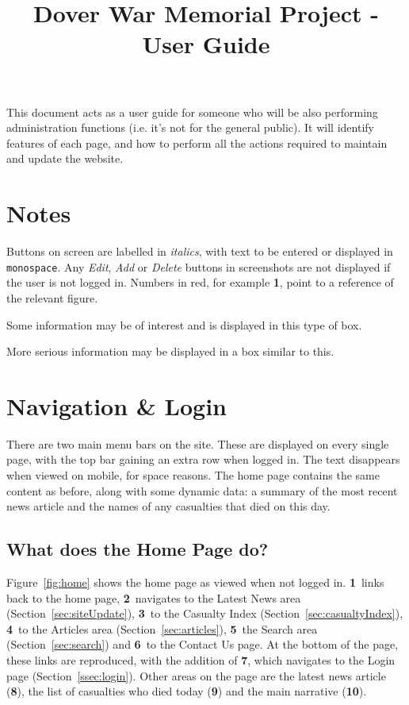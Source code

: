 \documentclass[12pt]{article}
\title{\vspace{-1cm}\textbf{Dover War Memorial Project - User Guide}\vspace{-1cm}}
\date{}
\author{}
\newcommand{\marker}[1]{\color{red}\textbf{#1}\color{black}}
\begin{document}
\maketitle

This document acts as a user guide for someone who will be also performing administration functions (i.e. it's not for the general public). It will identify features of each page, and how to perform all the actions required to maintain and update the website.

\tableofcontents

\section{Notes}
Buttons on screen are labelled in \textit{italics}, with text to be entered or displayed in \texttt{monospace}. Any \textit{Edit}, \textit{Add} or \textit{Delete} buttons in screenshots are not displayed if the user is not logged in. Numbers in red, for example \marker{1}, point to a reference of the relevant figure.

\begin{infoBox}
Some information may be of interest and is displayed in this type of box.
\end{infoBox}

\begin{warningBox}
More serious information may be displayed in a box similar to this.
\end{warningBox}

\newpage

\section{Navigation \& Login}
There are two main menu bars on the site. These are displayed on every single page, with the top bar gaining an extra row when logged in. The text disappears when viewed on mobile, for space reasons. The home page contains the same content as before, along with some dynamic data: a summary of the most recent news article and the names of any casualties that died on this day.

\subsection{What does the Home Page do?}
Figure~\ref{fig:home} shows the home page as viewed when not logged in. \marker{1}\ links back to the home page, \marker{2}\ navigates to the Latest News area (Section~\ref{sec:siteUpdate}), \marker{3}\ to the Casualty Index (Section~\ref{sec:casualtyIndex}), \marker{4}\ to the Articles area (Section~\ref{sec:articles}), \marker{5}\ the Search area (Section~\ref{sec:search}) and \marker{6}\ to the Contact Us page. At the bottom of the page, these links are reproduced, with the addition of \marker{7}, which navigates to the Login page (Section~\ref{ssec:login}). Other areas on the page are the latest news article (\marker{8}), the list of casualties who died today (\marker{9}) and the main narrative (\marker{10}).
\end{document}
